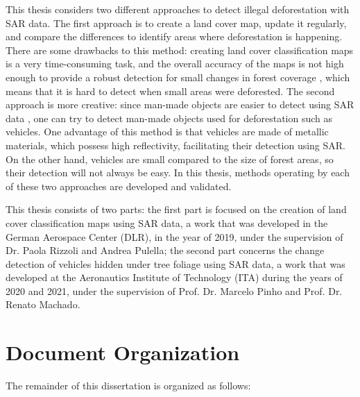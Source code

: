 This thesis considers two different approaches to detect illegal deforestation with SAR data.
The first approach is to create a land cover map, update it regularly, and compare the differences to identify
areas where deforestation is happening.
There are some drawbacks to this method: creating land cover classification maps is a very time-consuming task,
and the overall accuracy of the maps is not high enough to provide a robust detection
for small changes in forest coverage \cite{Rodrigo},
which means that it is hard to detect when small areas were deforested.
The second approach is more creative: since man-made objects are easier to detect using SAR data \cite{manmade},
one can try to detect man-made objects used for deforestation such as vehicles.
One advantage of this method is that vehicles are made of metallic materials,
which possess high reflectivity, facilitating their detection using SAR.
On the other hand, vehicles are small compared to the size of forest areas,
so their detection will not always be easy.
In this thesis, methods operating by each of these two approaches are developed and validated.

This thesis consists of two parts: the first part is focused on the creation of land cover classification maps
using SAR data, a work that was developed in the German Aerospace Center (DLR), in the year of 2019, under the supervision of Dr. Paola Rizzoli and Andrea Pulella; the second part concerns the
change detection of vehicles hidden under tree foliage using SAR data, a work that was developed at the Aeronautics Institute of Technology (ITA) during the years of 2020 and 2021, under the supervision of Prof. Dr. Marcelo Pinho and Prof. Dr. Renato Machado.

\section{Document Organization}
The remainder of this dissertation is organized as follows:

